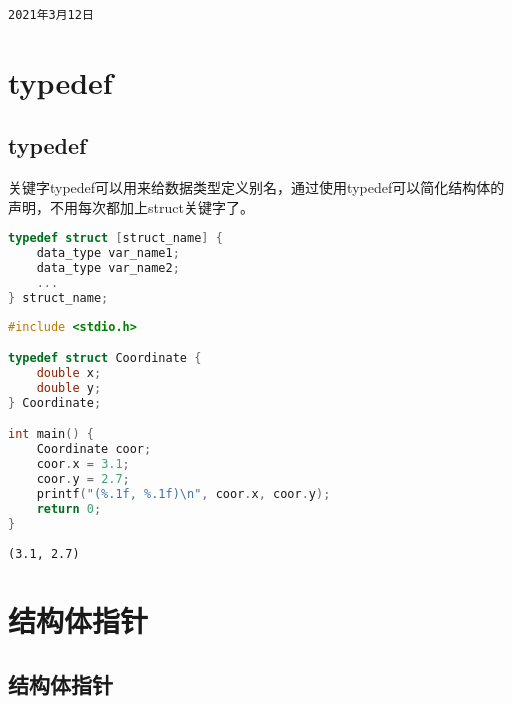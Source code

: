 \begin{tcolorbox}
	\begin{verbatim}
2021年3月12日
	\end{verbatim}
\end{tcolorbox}

\newpage

\section{typedef}

\subsection{typedef}

关键字typedef可以用来给数据类型定义别名，通过使用typedef可以简化结构体的声明，不用每次都加上struct关键字了。

\vspace{-0.5cm}

\begin{lstlisting}[language=C]
typedef struct [struct_name] {
    data_type var_name1;
    data_type var_name2;
    ...
} struct_name;
\end{lstlisting}

\vspace{0.5cm}


\begin{lstlisting}[language=C]
#include <stdio.h>

typedef struct Coordinate {
    double x;
    double y;
} Coordinate;

int main() {
    Coordinate coor;
    coor.x = 3.1;
    coor.y = 2.7;
    printf("(%.1f, %.1f)\n", coor.x, coor.y);
    return 0;
}
\end{lstlisting}

\begin{tcolorbox}
	\begin{verbatim}
(3.1, 2.7)
	\end{verbatim}
\end{tcolorbox}

\newpage

\section{结构体指针}

\subsection{结构体指针}

